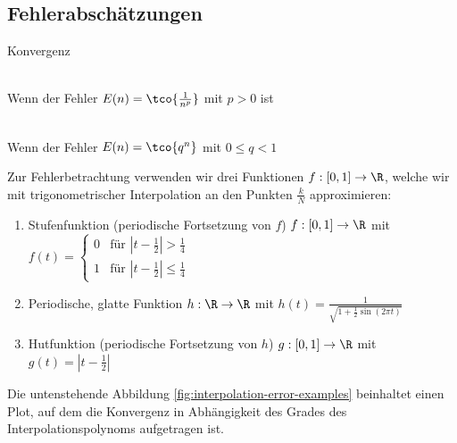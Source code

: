\newsection
\subsection{Fehlerabschätzungen}

\begin{definition}[]{Konvergenz}
    \begin{multicols}{2}
        \\
        Wenn der Fehler $E(n) = \tco{\frac{1}{n^p}}$ mit $p > 0$ ist

        \\
        Wenn der Fehler $E(n) = \tco{q^n}$ mit $0 \leq q < 1$
    \end{multicols}
\end{definition}

\inlineex Zur Fehlerbetrachtung verwenden wir drei Funktionen $f : [0, 1] \rightarrow \R$, welche wir mit trigonometrischer Interpolation an den Punkten $\frac{k}{N}$ approximieren:
\begin{enumerate}[label=(\Roman*)]
    \item Stufenfunktion (periodische Fortsetzung von $f$) $f : [0, 1] \rightarrow \R$ mit $f(t) = \begin{cases}
                  0 & \text{für } \left| t - \frac{1}{2} \right| > \frac{1}{4}    \\
                  1 & \text{für } \left| t - \frac{1}{2} \right| \leq \frac{1}{4}
              \end{cases}$
    \item Periodische, glatte Funktion $h: \R \rightarrow \R$ mit $h(t) = \displaystyle \frac{1}{\sqrt{1 + \frac{1}{2} \sin(2\pi t)}}$
    \item Hutfunktion (periodische Fortsetzung von $h$) $g : [0, 1] \rightarrow \R$ mit $g(t) = \left| t - \frac{1}{2} \right|$
\end{enumerate}
Die untenstehende Abbildung \ref{fig:interpolation-error-examples} beinhaltet einen Plot, auf dem die Konvergenz in Abhängigkeit des Grades des Interpolationspolynoms aufgetragen ist.

